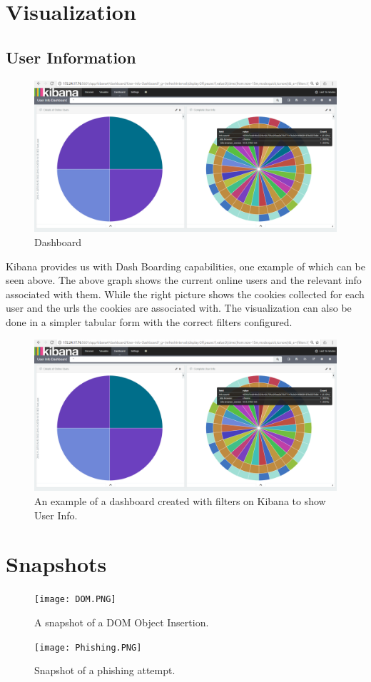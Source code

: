 \chapter{Visualization}
\section{User Information}
\begin{figure}[h!]
	\centering\includegraphics[width=\textwidth,height=\textheight,keepaspectratio]{dashboard.png}
	\caption{Dashboard}
	\label{fig:3}
\end{figure}

\justify Kibana provides us with Dash Boarding capabilities, one example of which can be seen above. The above graph shows the current online users and the relevant info associated with them. While the right picture shows the cookies collected for each user and the urls the cookies are associated with. The visualization can also be done in a simpler tabular form with the correct filters configured.

\begin{figure}[h!]
	\centering\includegraphics[width=\textwidth,height=\textheight,keepaspectratio]{Dashboard.PNG}
	\caption{An example of a dashboard created with filters on Kibana to show User Info.}
	\label{fig:4}
\end{figure}

\chapter{Snapshots}
\begin{figure}[h!]
	\centering\texttt{[image: DOM.PNG]}
	\caption{A snapshot of a DOM Object Insertion.}
	\label{fig:5}
\end{figure}

\begin{figure}[h!]
	\centering\texttt{[image: Phishing.PNG]}
	\caption{Snapshot of a phishing attempt.}
	\label{fig:6}
\end{figure}
